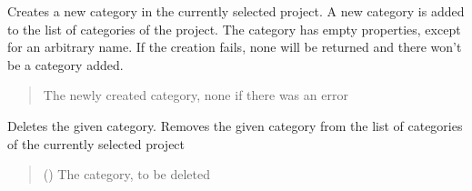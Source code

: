 \documentclass[letterpaper,10pt,english]{sphinxmanual}
\begin{document}
\begin{fulllineitems}
\begin{fulllineitems}
\begin{quote}
\begin{description}
\end{description}\end{quote}

\end{fulllineitems}


\begin{fulllineitems}
\label{\detokenize{apidoc/src.osm_configurator.control:src.osm_configurator.control.category_controller.CategoryController.create_category}}
\pysigstartsignatures
{}
\pysigstopsignatures
\sphinxAtStartPar
Creates a new category in the currently selected project.
A new category is added to the list of categories of the project. The category has empty properties, except for an arbitrary name.
If the creation fails, none will be returned and there won’t be a category added.
\begin{quote}\begin{description}
\sphinxAtStartPar
The newly created category, none if there was an error

\sphinxAtStartPar
{\hyperref[\detokenize{apidoc/src.osm_configurator.model.project.configuration:src.osm_configurator.model.project.configuration.category.Category}]{}}

\end{description}\end{quote}

\end{fulllineitems}


\begin{fulllineitems}
\label{\detokenize{apidoc/src.osm_configurator.control:src.osm_configurator.control.category_controller.CategoryController.delete_category}}
\pysigstartsignatures
{}
\pysigstopsignatures
\sphinxAtStartPar
Deletes the given category.
Removes the given category from the list of categories of the currently selected project
\begin{quote}\begin{description}
\sphinxAtStartPar
{} ({\hyperref[\detokenize{apidoc/src.osm_configurator.model.project.configuration:src.osm_configurator.model.project.configuration.category.Category}]{}}) \textendash{} The category, to be deleted


\end{description}
\end{quote}
\end{fulllineitems}
\end{fulllineitems}
\end{document}
